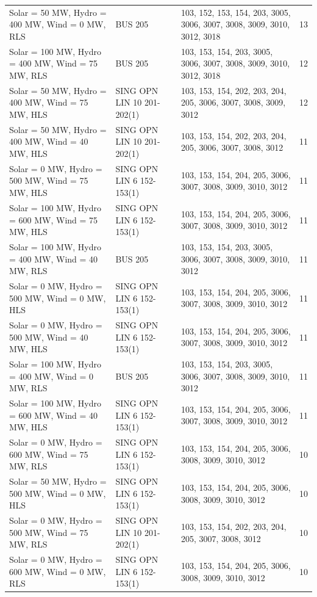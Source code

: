 \documentclass[10pt]{report}
\begin{document}
\begin{table}[H]
{\begin{tabular}{llp{9cm}r}
Solar = 50 MW, Hydro = 400 MW, Wind = 0 MW, RLS & BUS 205 & 103, 152, 153, 154, 203, 3005, 3006, 3007, 3008, 3009, 3010, 3012, 3018 & 13 \\
Solar = 100 MW, Hydro = 400 MW, Wind = 75 MW, RLS & BUS 205 & 103, 153, 154, 203, 3005, 3006, 3007, 3008, 3009, 3010, 3012, 3018 & 12 \\
Solar = 50 MW, Hydro = 400 MW, Wind = 75 MW, HLS & SING OPN LIN   10 201-202(1) & 103, 153, 154, 202, 203, 204, 205, 3006, 3007, 3008, 3009, 3012 & 12 \\
Solar = 50 MW, Hydro = 400 MW, Wind = 40 MW, HLS & SING OPN LIN   10 201-202(1) & 103, 153, 154, 202, 203, 204, 205, 3006, 3007, 3008, 3012 & 11 \\
Solar = 0 MW, Hydro = 500 MW, Wind = 75 MW, HLS & SING OPN LIN   6 152-153(1) & 103, 153, 154, 204, 205, 3006, 3007, 3008, 3009, 3010, 3012 & 11 \\
Solar = 100 MW, Hydro = 600 MW, Wind = 75 MW, HLS & SING OPN LIN   6 152-153(1) & 103, 153, 154, 204, 205, 3006, 3007, 3008, 3009, 3010, 3012 & 11 \\
Solar = 100 MW, Hydro = 400 MW, Wind = 40 MW, RLS & BUS 205 & 103, 153, 154, 203, 3005, 3006, 3007, 3008, 3009, 3010, 3012 & 11 \\
Solar = 0 MW, Hydro = 500 MW, Wind = 0 MW, HLS & SING OPN LIN   6 152-153(1) & 103, 153, 154, 204, 205, 3006, 3007, 3008, 3009, 3010, 3012 & 11 \\
Solar = 0 MW, Hydro = 500 MW, Wind = 40 MW, HLS & SING OPN LIN   6 152-153(1) & 103, 153, 154, 204, 205, 3006, 3007, 3008, 3009, 3010, 3012 & 11 \\
Solar = 100 MW, Hydro = 400 MW, Wind = 0 MW, RLS & BUS 205 & 103, 153, 154, 203, 3005, 3006, 3007, 3008, 3009, 3010, 3012 & 11 \\
Solar = 100 MW, Hydro = 600 MW, Wind = 40 MW, HLS & SING OPN LIN   6 152-153(1) & 103, 153, 154, 204, 205, 3006, 3007, 3008, 3009, 3010, 3012 & 11 \\
Solar = 0 MW, Hydro = 600 MW, Wind = 75 MW, RLS & SING OPN LIN   6 152-153(1) & 103, 153, 154, 204, 205, 3006, 3008, 3009, 3010, 3012 & 10 \\
Solar = 50 MW, Hydro = 500 MW, Wind = 0 MW, HLS & SING OPN LIN   6 152-153(1) & 103, 153, 154, 204, 205, 3006, 3008, 3009, 3010, 3012 & 10 \\
Solar = 0 MW, Hydro = 500 MW, Wind = 75 MW, RLS & SING OPN LIN   10 201-202(1) & 103, 153, 154, 202, 203, 204, 205, 3007, 3008, 3012 & 10 \\
Solar = 0 MW, Hydro = 600 MW, Wind = 0 MW, RLS & SING OPN LIN   6 152-153(1) & 103, 153, 154, 204, 205, 3006, 3008, 3009, 3010, 3012 & 10 \\

\end{tabular}}
\end{table}
\end{document}
